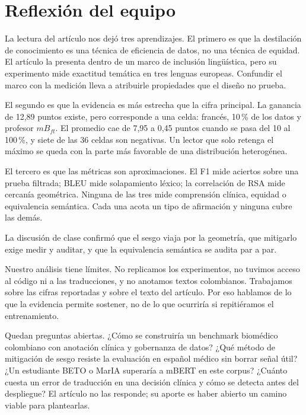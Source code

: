 \section{Reflexión del equipo}
\label{sec:reflexion}

La lectura del artículo nos dejó tres aprendizajes. El primero es que la destilación de conocimiento es una técnica de eficiencia de datos, no una técnica de equidad. El artículo la presenta dentro de un marco de inclusión lingüística, pero su experimento mide exactitud temática en tres lenguas europeas. Confundir el marco con la medición lleva a atribuirle propiedades que el diseño no prueba.

El segundo es que la evidencia es más estrecha que la cifra principal. La ganancia de 12,89 puntos existe, pero corresponde a una celda: francés, 10\,\% de los datos y profesor $mB_{ft}$. El promedio cae de 7,95 a 0,45 puntos cuando se pasa del 10 al 100\,\%, y siete de las 36 celdas son negativas. Un lector que solo retenga el máximo se queda con la parte más favorable de una distribución heterogénea.

El tercero es que las métricas son aproximaciones. El F1 mide aciertos sobre una prueba filtrada; BLEU mide solapamiento léxico; la correlación de RSA mide cercanía geométrica. Ninguna de las tres mide comprensión clínica, equidad o equivalencia semántica. Cada una acota un tipo de afirmación y ninguna cubre las demás.

La discusión de clase confirmó que el sesgo viaja por la geometría, que mitigarlo exige medir y auditar, y que la equivalencia semántica se audita par a par.

Nuestro análisis tiene límites. No replicamos los experimentos, no tuvimos acceso al código ni a las traducciones, y no anotamos textos colombianos. Trabajamos sobre las cifras reportadas y sobre el texto del artículo. Por eso hablamos de lo que la evidencia permite sostener, no de lo que ocurriría si repitiéramos el entrenamiento.

Quedan preguntas abiertas. ¿Cómo se construiría un benchmark biomédico colombiano con anotación clínica y gobernanza de datos? ¿Qué método de mitigación de sesgo resiste la evaluación en español médico sin borrar señal útil? ¿Un estudiante BETO o MarIA superaría a mBERT en este corpus? ¿Cuánto cuesta un error de traducción en una decisión clínica y cómo se detecta antes del despliegue? El artículo no las responde; su aporte es haber abierto un camino viable para plantearlas.
